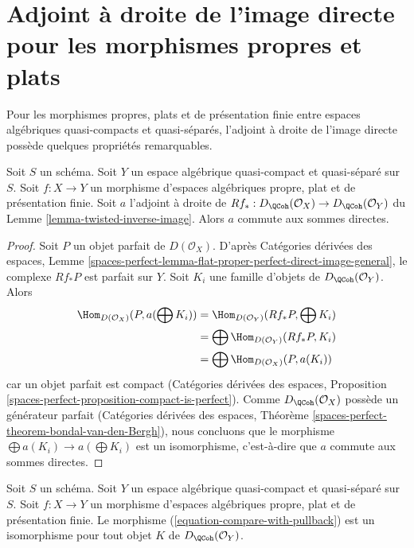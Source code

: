  
\section{Adjoint à droite de l'image directe pour les morphismes propres et plats}
\label{section-proper-flat}

\noindent
Pour les morphismes propres, plats et de présentation finie entre espaces algébriques
quasi-compacts et quasi-séparés, l'adjoint à droite de l'image directe
possède quelques propriétés remarquables.

\begin{lemma}
\label{lemma-proper-flat}
Soit $S$ un schéma.
Soit $Y$ un espace algébrique quasi-compact et quasi-séparé sur $S$.
Soit $f : X \to Y$ un morphisme d'espaces algébriques propre, plat et
de présentation finie.
Soit $a$ l'adjoint à droite de
$Rf_* : D_\QCoh(\mathcal{O}_X) \to D_\QCoh(\mathcal{O}_Y)$ du
Lemme \ref{lemma-twisted-inverse-image}. Alors $a$ commute aux sommes directes.
\end{lemma}

\begin{proof}
Soit $P$ un objet parfait de $D(\mathcal{O}_X)$. D'après
Catégories dérivées des espaces, Lemme
\ref{spaces-perfect-lemma-flat-proper-perfect-direct-image-general},
le complexe $Rf_*P$ est parfait sur $Y$.
Soit $K_i$ une famille d'objets de $D_\QCoh(\mathcal{O}_Y)$.
Alors
\begin{align*}
\Hom_{D(\mathcal{O}_X)}(P, a(\bigoplus K_i))
& =
\Hom_{D(\mathcal{O}_Y)}(Rf_*P, \bigoplus K_i) \\
& =
\bigoplus \Hom_{D(\mathcal{O}_Y)}(Rf_*P, K_i) \\
& =
\bigoplus \Hom_{D(\mathcal{O}_X)}(P, a(K_i))
\end{align*}
car un objet parfait est compact (Catégories dérivées des espaces,
Proposition \ref{spaces-perfect-proposition-compact-is-perfect}).
Comme $D_\QCoh(\mathcal{O}_X)$ possède un générateur parfait
(Catégories dérivées des espaces, Théorème
\ref{spaces-perfect-theorem-bondal-van-den-Bergh}),
nous concluons que le morphisme $\bigoplus a(K_i) \to a(\bigoplus K_i)$
est un isomorphisme, c'est-à-dire que $a$ commute aux sommes directes.
\end{proof}

\begin{lemma}
\label{lemma-compare-with-pullback-flat-proper}
Soit $S$ un schéma.
Soit $Y$ un espace algébrique quasi-compact et quasi-séparé sur $S$.
Soit $f : X \to Y$ un morphisme d'espaces algébriques propre, plat et
de présentation finie.
Le morphisme (\ref{equation-compare-with-pullback}) est un isomorphisme
pour tout objet $K$ de $D_\QCoh(\mathcal{O}_Y)$.
\end{lemma}

